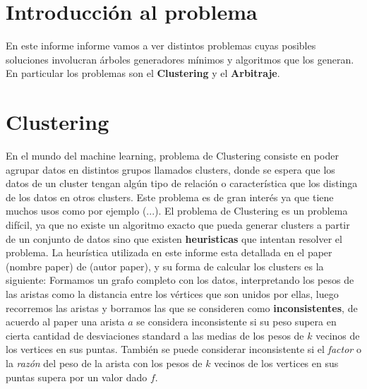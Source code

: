 \documentclass[8pt,a4paper]{article}
\begin{document}

\fecha{\today}



\maketitle

\newpage
%

\section{Introducción al problema}
En este informe informe vamos a ver distintos problemas cuyas posibles soluciones involucran árboles generadores mínimos y algoritmos que los generan. En particular los problemas son el \textbf{Clustering} y el \textbf{Arbitraje}.

\section{Clustering}
En el mundo del machine learning, problema de Clustering consiste en poder agrupar datos en distintos grupos llamados clusters, donde se espera que los datos de un cluster tengan algún tipo de relación o característica que los distinga de los datos en otros clusters. Este problema es de gran interés ya que tiene muchos usos como por ejemplo (...).
%
%
El problema de Clustering es un problema difícil, ya que no existe un algoritmo exacto que pueda generar clusters a partir de un conjunto de datos sino que existen \textbf{heuristicas} que intentan resolver el problema. La heurística utilizada en este informe esta detallada en el paper (nombre paper) de (autor paper), y su forma de calcular los clusters es la siguiente: Formamos un grafo completo con los datos, interpretando los pesos de las aristas como la distancia entre los vértices que son unidos por ellas, luego recorremos las aristas y borramos las que se consideren como \textbf{inconsistentes}, de acuerdo al paper una arista $a$ se considera inconsistente si su peso supera en cierta cantidad de desviaciones standard a las medias de los pesos de $k$ vecinos de los vertices en sus puntas. También se puede considerar inconsistente si el \textit{factor} o la \textit{razón} del peso de la arista con los pesos de $k$ vecinos de los vertices en sus puntas supera por un valor dado $f$.
\end{document}
